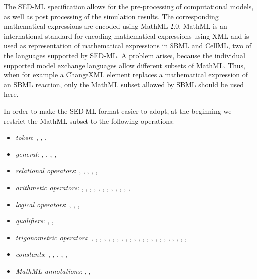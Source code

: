 \label{sec:mathML}
The SED-ML specification allows for the pre-processing of computational models, 
as well as post processing of the simulation results. The corresponding 
mathematical expressions are encoded using MathML 2.0. MathML is an 
international standard for encoding mathematical expressions using XML and is 
used as representation of mathematical expressions in SBML and CellML, two of 
the languages supported by SED-ML. A problem arises, because the individual 
supported model exchange languages allow different subsets of MathML. Thus, 
when for example a ChangeXML element replaces a mathematical expression of  an 
SBML reaction, only the MathML subset allowed by SBML should be used here. 

In order to make the SED-ML format easier to adopt, at the beginning we 
restrict the MathML subset to the following operations: 

\begin{itemize}\setlength{\parskip}{-0.1ex}

\item \emph{token}: , , ,
  
\item \emph{general}: , ,
  , ,  

\item \emph{relational operators}: , ,
  , , , 

\item \emph{arithmetic operators}: , ,
  , , , ,
  , , , ,
  , , 

\item \emph{logical operators}: , ,
  , 

\item \emph{qualifiers}: , ,

\item \emph{trigonometric operators}: , ,
  , , , ,
  , , , ,
  , , , ,
  , , , ,
  , , ,
  , , 

\item \emph{constants}: , ,
  , , ,

\item \emph{MathML annotations}: ,
  , 

\end{itemize}

